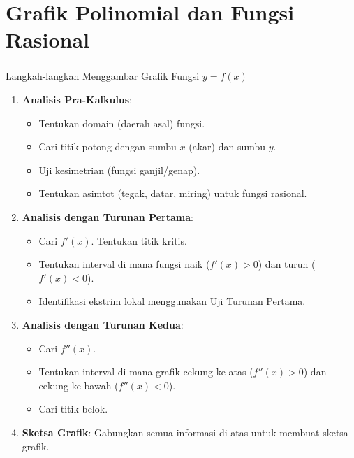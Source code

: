 \documentclass{../../kalkulus-ppt}
\begin{document}
\section{Grafik Polinomial dan Fungsi Rasional}
\begin{frame}
  \frametitle{\insertsection}
  \begin{block}{Langkah-langkah Menggambar Grafik Fungsi $y=f(x)$}
    \begin{enumerate}
      \item \textbf{Analisis Pra-Kalkulus}:
            \begin{itemize}
              \item Tentukan domain (daerah asal) fungsi.
              \item Cari titik potong dengan sumbu-$x$ (akar) dan sumbu-$y$.
              \item Uji kesimetrian (fungsi ganjil/genap).
              \item Tentukan asimtot (tegak, datar, miring) untuk fungsi rasional.
            \end{itemize}
      \item \textbf{Analisis dengan Turunan Pertama}:
            \begin{itemize}
              \item Cari $f'(x)$. Tentukan titik kritis.
              \item Tentukan interval di mana fungsi naik ($f'(x)>0$) dan turun ($f'(x)<0$).
              \item Identifikasi ekstrim lokal menggunakan Uji Turunan Pertama.
            \end{itemize}
      \item \textbf{Analisis dengan Turunan Kedua}:
            \begin{itemize}
              \item Cari $f''(x)$.
              \item Tentukan interval di mana grafik cekung ke atas ($f''(x)>0$) dan cekung ke bawah ($f''(x)<0$).
              \item Cari titik belok.
            \end{itemize}
      \item \textbf{Sketsa Grafik}: Gabungkan semua informasi di atas untuk membuat sketsa grafik.
    \end{enumerate}
  \end{block}
\end{frame}
\end{document}
